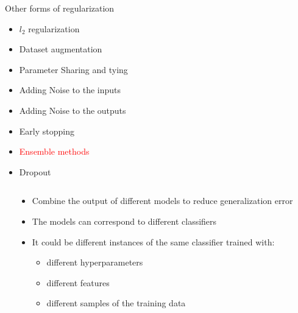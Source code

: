 \begin{frame}
\end{frame}

\begin{frame}
	\vspace{4em}
	\begin{overlayarea}{\textwidth}{\textheight}
		\begin{block}{Other forms of regularization}
			\begin{itemize}
				\item $l_2$ regularization
				\item Dataset augmentation
				\item Parameter Sharing and tying
				\item Adding Noise to the inputs
				\item Adding Noise to the outputs 
				\item Early stopping
				\item \textcolor<2->{red}{Ensemble methods}
				\item Dropout
			\end{itemize}
		\end{block}
	\end{overlayarea}
\end{frame}

\begin{frame}
	\begin{columns}
		\begin{overlayarea}{\textwidth}{\textheight}
			\justifying
			\only<1->{
				
			}
		\end{overlayarea}
		\begin{overlayarea}{\textwidth}{\textheight}
			\begin{itemize}
				\justifying
							
				\item <1-> Combine the output of different models to reduce generalization error
				      \item<2->  The models can correspond to different classifiers
				      \item<3-> It could be different instances of the same classifier trained with:
				      \begin{itemize}
				      	\justifying
				      	\item<4-> different hyperparameters
				      	\item<5-> different features
				      	\item<6-> different samples of the training data
				      \end{itemize}
			\end{itemize}
		\end{overlayarea}
	\end{columns}
\end{frame}


